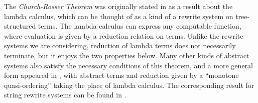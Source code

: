 \documentclass[../generics]{subfiles}
\begin{document}
The \emph{Church-Rosser Theorem} was originally stated in \cite{conversion} as a result about the lambda calculus, which can be thought of as a kind of a rewrite system on tree-structured terms. The lambda calculus can express any computable function, where evaluation is given by a reduction relation on terms. Unlike the rewrite systems we are considering, reduction of lambda terms does not necessarily terminate, but it enjoys the two properties below. Many other kinds of abstract systems also satisfy the necessary conditions of this theorem, and a more general form appeared in \cite{combinatory}, with abstract terms and reduction given by a ``monotone quasi-ordering'' taking the place of lambda calculus. The corresponding result for string rewrite systems can be found in \cite{book2012string}.
\end{document}
